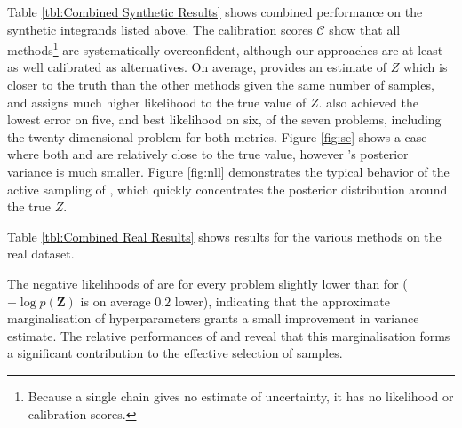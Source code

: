 \documentclass{article} %
\begin{document}
\begin{table}[h!]
\begin{minipage}[b]{0.5\linewidth}\centering

\end{minipage}
\begin{minipage}[b]{0.5\linewidth}\centering

\end{minipage}
%
\end{table}

Table \ref{tbl:Combined Synthetic Results} shows combined performance on the synthetic integrands listed above. The calibration scores $\mathcal{C}$ show that all methods\footnote{Because a single  chain gives no estimate of uncertainty, it has no likelihood or calibration scores.} are systematically overconfident, although our approaches are at least as well calibrated as alternatives. On average,  provides an estimate of $Z$ which is closer to the truth than the other methods given the same number of samples, and assigns much higher likelihood to the true value of $Z$.  also achieved the lowest error on five, and best likelihood on six, of the seven problems, including the twenty dimensional problem for both metrics.  Figure \ref{fig:se} shows a case where both
  and  are relatively close to the true value, however 's posterior variance is much smaller.  Figure \ref{fig:nll} demonstrates the typical behavior of the active sampling of , which quickly concentrates the posterior distribution around the true $Z$. 

Table \ref{tbl:Combined Real Results} shows results for the various methods on the real dataset.  

The negative likelihoods of  are for every problem slightly lower than for  ($-\log p(\mathbf{Z})$ is on average $0.2$ lower), indicating that the approximate marginalisation of hyperparameters grants a small improvement in variance estimate. The relative performances of  and  reveal that this marginalisation forms a significant contribution to the effective selection of samples. 
\end{document}
